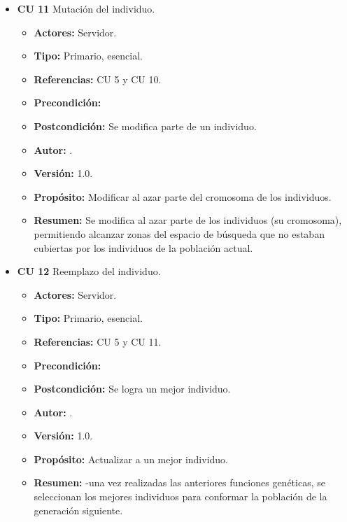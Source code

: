 \begin{itemize}
	\item \textbf{CU 11} Mutación del individuo.
	\begin{itemize}
		\item \textbf{Actores:} Servidor.
		\item \textbf{Tipo:} Primario, esencial.
		\item \textbf{Referencias:} CU 5 y CU 10.
		\item \textbf{Precondición:}
		\item \textbf{Postcondición:} Se modifica parte de un individuo.
		\item\textbf{ Autor:} {\autor}.
		\item \textbf{Versión:} 1.0.
		\item \textbf{Propósito:} Modificar al azar parte del cromosoma de los individuos.
		\item \textbf{Resumen:} Se modifica al azar parte de los individuos (su cromosoma), permitiendo alcanzar zonas del espacio de búsqueda que no estaban cubiertas por los individuos de la población actual.
	\end{itemize}	

	\item \textbf{CU 12} Reemplazo del individuo.
	\begin{itemize}
		\item \textbf{Actores:} Servidor.
		\item \textbf{Tipo:} Primario, esencial.
		\item \textbf{Referencias:} CU 5 y CU 11.
		\item \textbf{Precondición:}
		\item \textbf{Postcondición:} Se logra un mejor individuo.
		\item\textbf{ Autor:} {\autor}.
		\item \textbf{Versión:} 1.0.
		\item \textbf{Propósito:} Actualizar a un mejor individuo.
		\item \textbf{Resumen:} -una vez realizadas las anteriores funciones genéticas, se seleccionan los mejores individuos para conformar la población de la generación siguiente.
	\end{itemize}	

	\newpage %
	

\end{itemize}
